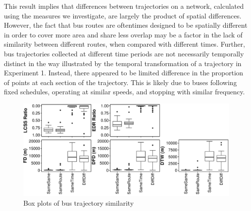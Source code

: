 \documentclass[10pt,letterpaper]{article}
\begin{document}
This result implies that differences between trajectories on a network, calculated using the measures we investigate, are largely the product of spatial differences. However, the fact that bus routes are oftentimes designed to be spatially different in order to cover more area and share less overlap may be a factor in the lack of similarity between different routes, when compared with different times. Further, bus trajectories collected at different time periods are not necessarily temporally distinct in the way illustrated by the temporal transformation of a trajectory in Experiment 1. Instead, there appeared to be limited difference in the proportion of points at each section of the trajectory. This is likely due to buses following fixed schedules, operating at similar speeds, and stopping with similar frequency.


    
\begin{figure}[ht]
	\includegraphics[width=\linewidth]{figures/Exp2}
	\caption{Box plots of bus trajectory similarity} \label{fig:bus_all}
\end{figure}

\end{document}
